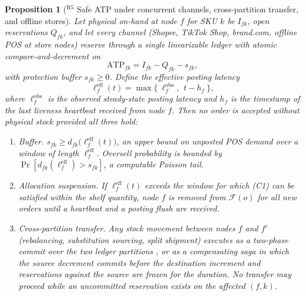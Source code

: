 \documentclass[10pt,twocolumn,letterpaper]{article}
\newtheorem{proposition}{Proposition}
\theoremstyle{definition}
\begin{document}
\begin{proposition}[$^{\mathrm{R5}}$ Safe ATP under concurrent channels, cross-partition transfer, and offline stores]\label{prop:atp}
Let physical on-hand at node $f$ for SKU $k$ be $I_{fk}$, open reservations $Q_{fk}$, and let every channel (Shopee, TikTok Shop, brand.com, offline POS at store nodes) reserve through a single linearizable ledger \cite{herlihy1990} with atomic compare-and-decrement on
\begin{equation}\label{eq:atp}
\mathrm{ATP}_{fk}=I_{fk}-Q_{fk}-s_{fk},
\end{equation}
with protection buffer $s_{fk}\ge0$. Define the \emph{effective posting latency}
\begin{equation}\label{eq:elleff}
\ell^{\mathrm{eff}}_{f}(t)=\max\bigl\{\ \ell^{\mathrm{obs}}_f,\ \ t-h_f\ \bigr\},
\end{equation}
where $\ell^{\mathrm{obs}}_f$ is the observed steady-state posting latency and $h_f$ is the timestamp of the last liveness heartbeat received from node $f$. Then no order is accepted without physical stock provided all three hold:
\begin{enumerate}
\item[(C1)] \emph{Buffer.} $s_{fk}\ge \hat d_{fk}\bigl(\ell^{\mathrm{eff}}_f(t)\bigr)$, an upper bound on unposted POS demand over a window of length $\ell^{\mathrm{eff}}_f$. Oversell probability is bounded by $\Pr[d_{fk}(\ell^{\mathrm{eff}}_f)>s_{fk}]$, a computable Poisson tail.
\item[(C2)] \emph{Allocation suspension.} If $\ell^{\mathrm{eff}}_f(t)$ exceeds the window for which (C1) can be satisfied within the shelf quantity, node $f$ is removed from $\mathcal{F}(o)$ for all new orders until a heartbeat and a posting flush are received.
\item[(C3)] \emph{Cross-partition transfer.} Any stock movement between nodes $f$ and $f'$ (rebalancing, substitution sourcing, split shipment) executes as a two-phase commit over the two ledger partitions \cite{gray1993}, or as a compensating saga \cite{garciamolina1987} in which the source decrement commits before the destination increment and reservations against the source are frozen for the duration. No transfer may proceed while an uncommitted reservation exists on the affected $(f,k)$.
\end{enumerate}
\end{proposition}
\end{document}

